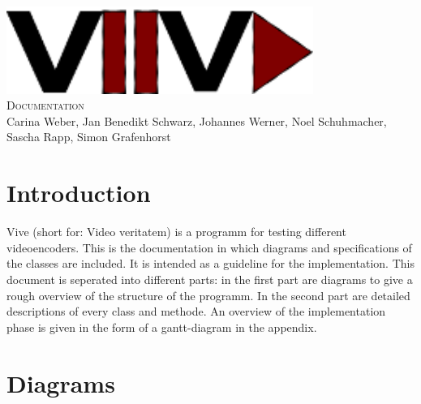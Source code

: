\documentclass[twoside]{book}
\newcommand{\+}{\discretionary{\mbox{\scriptsize$\hookleftarrow$}}{}{}}
\newcommand{\clearemptydoublepage}{%
  \newpage{\pagestyle{empty}\cleardoublepage}%
}
\begin{document}
\hypersetup{pageanchor=false,
             bookmarks=true,
             bookmarksnumbered=true,
             pdfencoding=unicode
            }
\begin{titlepage}
\vspace*{7cm}
\begin{center}%
{\centering\includegraphics[width=10cm]{Logo.png}}\\
\vspace*{2cm}
\fontsize{40}{48} \selectfont \textsc{Documentation}\\
\vspace*{1cm}
\vspace*{0.5cm}
{\small Carina Weber, Jan Benedikt Schwarz, Johannes Werner, Noel Schuhmacher, Sascha Rapp, Simon Grafenhorst}\\
\end{center}
\end{titlepage}
\clearemptydoublepage
\tableofcontents
{}
\hypersetup{pageanchor=true}

\chapter{Introduction}
Vive (short for: Video veritatem) is a programm for testing different videoencoders. This is the documentation in which diagrams and specifications of the classes are included. It is intended as a guideline for the implementation.
This document is seperated into different parts: in the first part are diagrams to give a rough overview of the structure of the programm. In the second part are detailed descriptions of every class and methode. An overview of the implementation phase is given in the form of a gantt-diagram in the appendix.
\chapter{Diagrams}
\end{document}

